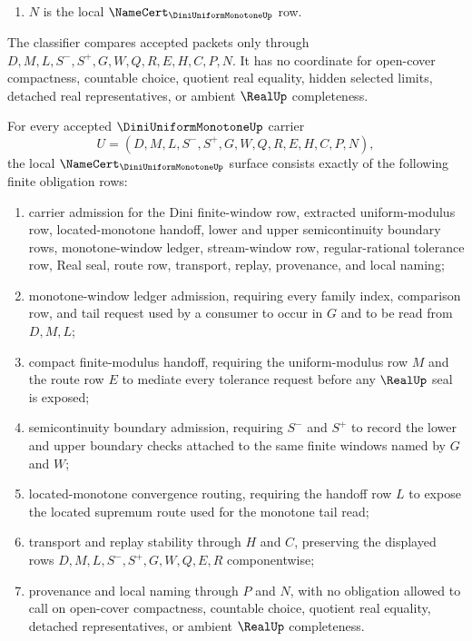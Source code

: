 \begin{definition}
\begin{enumerate}
\item $N$ is the local $\NameCert_{\DiniUniformMonotoneUp}$ row.
\end{enumerate}
The classifier compares accepted packets only through $D,M,L,S^{-},S^{+},G,W,Q,R,E,H,C,P,N$. It has no coordinate for open-cover compactness, countable choice, quotient real equality, hidden selected limits, detached real representatives, or ambient $\RealUp$ completeness.
\end{definition}

\begin{theorem}\label{thm:dini-uniform-monotone-namecert-obligations}
For every accepted $\DiniUniformMonotoneUp$ carrier
$$
U=(D,M,L,S^{-},S^{+},G,W,Q,R,E,H,C,P,N),
$$
the local $\NameCert_{\DiniUniformMonotoneUp}$ surface consists exactly of the following finite obligation rows:
\begin{enumerate}
\item carrier admission for the Dini finite-window row, extracted uniform-modulus row, located-monotone handoff, lower and upper semicontinuity boundary rows, monotone-window ledger, stream-window row, regular-rational tolerance row, Real seal, route row, transport, replay, provenance, and local naming;
\item monotone-window ledger admission, requiring every family index, comparison row, and tail request used by a consumer to occur in $G$ and to be read from $D,M,L$;
\item compact finite-modulus handoff, requiring the uniform-modulus row $M$ and the route row $E$ to mediate every tolerance request before any $\RealUp$ seal is exposed;
\item semicontinuity boundary admission, requiring $S^{-}$ and $S^{+}$ to record the lower and upper boundary checks attached to the same finite windows named by $G$ and $W$;
\item located-monotone convergence routing, requiring the handoff row $L$ to expose the located supremum route used for the monotone tail read;
\item transport and replay stability through $H$ and $C$, preserving the displayed rows $D,M,L,S^{-},S^{+},G,W,Q,E,R$ componentwise;
\item provenance and local naming through $P$ and $N$, with no obligation allowed to call on open-cover compactness, countable choice, quotient real equality, detached representatives, or ambient $\RealUp$ completeness.
\end{enumerate}
\end{theorem}
